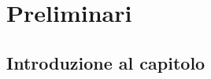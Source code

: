 \chapter{Preliminari}
\label{chap:preliminari}

\acresetall

%
%

\section{Introduzione al capitolo}

